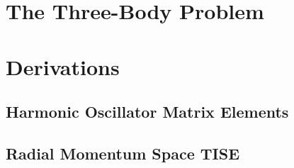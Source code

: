 \documentclass[12pt,a4paper]{report}
\begin{document}
\chapter{The Three-Body Problem}
\label{cha:three-body}


% 
% 
% 

\appendix

\chapter{Derivations}

\section{Harmonic Oscillator Matrix Elements}
\label{sec:HO matrix elements}



\section{Radial Momentum Space TISE}
\label{sec:radial mom space TISE}




{}
\end{document}
